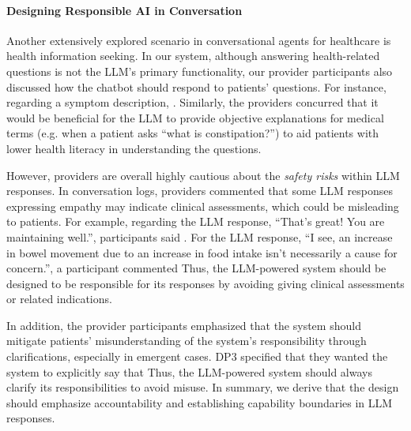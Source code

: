 \paragraph{Designing Responsible AI in Conversation}
\label{3-PD-finding-responsible}
Another extensively explored scenario in conversational agents for healthcare is health information seeking. In our system, although answering health-related questions is not the LLM's primary functionality, our provider participants also discussed how the chatbot should respond to patients' questions. For instance, regarding a symptom description, .
Similarly, the providers concurred that it would be beneficial for the LLM to provide objective explanations for medical terms (e.g. when a patient asks ``what is constipation?'') to aid patients with lower health literacy in understanding the questions.

However, providers are overall highly cautious about the \textit{safety risks} within LLM responses. In conversation logs, providers commented that some LLM responses expressing empathy may indicate clinical assessments, which could be misleading to patients.
For example, regarding the LLM response, ``That's great! You are maintaining well.'', participants said . For the LLM response, ``I see, an increase in bowel movement due to an increase in food intake isn't necessarily a cause for concern.'', a participant commented  Thus, the LLM-powered system should be designed to be responsible for its responses by avoiding giving clinical assessments or related indications.

In addition, the provider participants emphasized that the system should mitigate patients' misunderstanding of the system's responsibility through clarifications, especially in emergent cases. DP3 specified that they wanted the system to explicitly say that 
Thus, the LLM-powered system should always clarify its responsibilities to avoid misuse.
In summary, we derive that the design should emphasize accountability and establishing capability boundaries in LLM responses.


